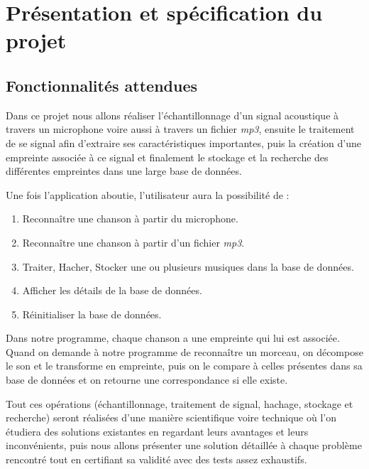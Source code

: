 \documentclass[10pt, report, english]{report}
\begin{document}
\chapter{Présentation et spécification du projet}
\section{Fonctionnalités attendues}
Dans ce projet nous allons réaliser l'échantillonnage d'un signal acoustique à travers un microphone voire aussi à travers un fichier \textit{mp3}, ensuite le traitement de se signal afin d'extraire ses caractéristiques importantes, puis la création d'une empreinte associée à ce signal et finalement le stockage et la recherche des différentes empreintes dans une large base de données.\\\par

Une fois l'application aboutie, l'utilisateur aura la possibilité de :\\

\begin{enumerate}
	\item Reconnaître une chanson à partir du microphone.
	\item Reconnaître une chanson à partir d'un fichier \textit{mp3}.
    \item Traiter, Hacher, Stocker une ou plusieurs musiques dans la base de données.
	\item Afficher les détails de la base de données.
	\item Réinitialiser la base de données.
\end{enumerate}

\vspace{0.5cm}
Dans notre programme, chaque chanson a une empreinte qui lui est associée. Quand on demande à notre programme de reconnaître un morceau, on décompose le son et le transforme en empreinte, puis on le compare à celles présentes dans sa base de données et on retourne une correspondance si elle existe.\\\par

Tout ces opérations (échantillonnage, traitement de signal, hachage, stockage et recherche) seront réalisées d'une manière scientifique voire technique où l'on étudiera des solutions existantes en regardant leurs avantages et leurs inconvénients, puis nous allons présenter une solution détaillée à chaque problème rencontré tout en certifiant sa validité avec des tests assez exhaustifs.
\end{document}
